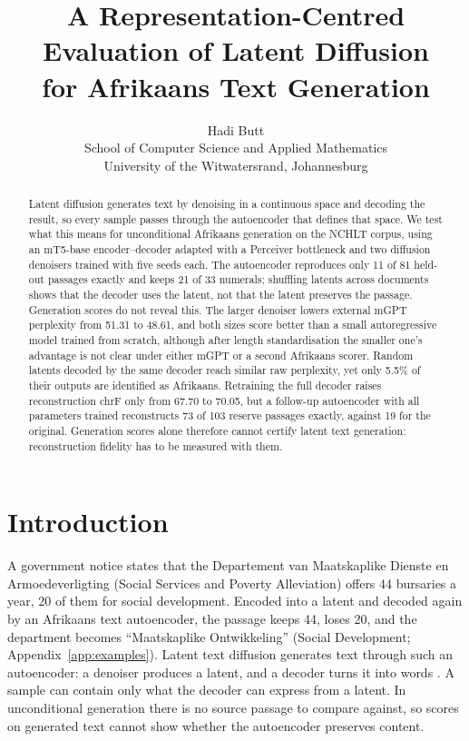 \documentclass[11pt,a4paper]{article}
\title{A Representation-Centred Evaluation of Latent Diffusion\\for Afrikaans Text Generation}
\author{Hadi Butt\\
School of Computer Science and Applied Mathematics\\
University of the Witwatersrand, Johannesburg}
\date{}
\begin{document}
\maketitle

\begin{abstract}
Latent diffusion generates text by denoising in a continuous space and decoding the result, so every sample passes through the autoencoder that defines that space. We test what this means for unconditional Afrikaans generation on the NCHLT corpus, using an mT5-base encoder--decoder adapted with a Perceiver bottleneck and two diffusion denoisers trained with five seeds each. The autoencoder reproduces only 11 of 81 held-out passages exactly and keeps 21 of 33 numerals; shuffling latents across documents shows that the decoder uses the latent, not that the latent preserves the passage. Generation scores do not reveal this. The larger denoiser lowers external mGPT perplexity from 51.31 to 48.61, and both sizes score better than a small autoregressive model trained from scratch, although after length standardisation the smaller one's advantage is not clear under either mGPT or a second Afrikaans scorer. Random latents decoded by the same decoder reach similar raw perplexity, yet only 5.5\% of their outputs are identified as Afrikaans. Retraining the full decoder raises reconstruction chrF only from 67.70 to 70.05, but a follow-up autoencoder with all parameters trained reconstructs 73 of 103 reserve passages exactly, against 19 for the original. Generation scores alone therefore cannot certify latent text generation: reconstruction fidelity has to be measured with them.
\end{abstract}

\section{Introduction}

A government notice states that the Departement van Maatskaplike Dienste en Armoedeverligting (Social Services and Poverty Alleviation) offers 44 bursaries a year, 20 of them for social development. Encoded into a latent and decoded again by an Afrikaans text autoencoder, the passage keeps 44, loses 20, and the department becomes ``Maatskaplike Ontwikkeling'' (Social Development; Appendix~\ref{app:examples}). Latent text diffusion generates text through such an autoencoder: a denoiser produces a latent, and a decoder turns it into words \citep{lovelace2023latent}. A sample can contain only what the decoder can express from a latent. In unconditional generation there is no source passage to compare against, so scores on generated text cannot show whether the autoencoder preserves content.
\end{document}
